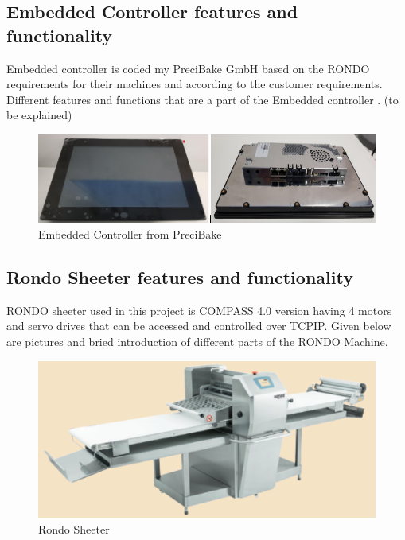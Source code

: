 \documentclass{listhesis}
\begin{document}
\subsection{Embedded Controller features and functionality}
Embedded controller is coded my PreciBake GmbH based on the RONDO requirements for their machines and according to the customer requirements. Different features  and functions that are a part of the Embedded controller  . (to be explained) 

\begin{figure}
  \includegraphics[width=\linewidth]{embeddedcontroller.png}
  \centering
  \caption{Embedded Controller from PreciBake}
  \label{fig:embeddedcontroller}
\end{figure}



\subsection{Rondo Sheeter features and functionality}
RONDO sheeter used in this project is COMPASS 4.0 version having 4 motors and servo drives that can be accessed and controlled over TCPIP. Given below are pictures and bried introduction of different parts of the RONDO Machine.

\begin{figure}
  \includegraphics[width=0.7\linewidth]{rondosheeter.png}
  \centering
  \caption{Rondo Sheeter}
  \label{fig:rondosheeter}
\end{figure}



\newpage
\end{document}

